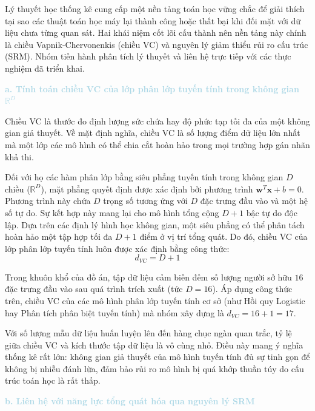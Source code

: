 Lý thuyết học thống kê cung cấp một nền tảng toán học vững chắc để giải thích tại sao các thuật toán học máy lại thành công hoặc thất bại khi đối mặt với dữ liệu chưa từng quan sát. Hai khái niệm cốt lõi cấu thành nên nền tảng này chính là chiều Vapnik-Chervonenkis (chiều VC) và nguyên lý giảm thiểu rủi ro cấu trúc (SRM). Nhóm tiến hành phân tích lý thuyết và liên hệ trực tiếp với các thực nghiệm đã triển khai.

\vspace{0.5em}
\noindent\textcolor{lightblue}{\textbf{a. Tính toán chiều VC của lớp phân lớp tuyến tính trong không gian $\mathbb{R}^D$}}
\vspace{0.5em}

Chiều VC là thước đo định lượng sức chứa hay độ phức tạp tối đa của một không gian giả thuyết. Về mặt định nghĩa, chiều VC là số lượng điểm dữ liệu lớn nhất mà một lớp các mô hình có thể chia cắt hoàn hảo trong mọi trường hợp gán nhãn khả thi.

Đối với họ các hàm phân lớp bằng siêu phẳng tuyến tính trong không gian $D$ chiều ($\mathbb{R}^D$), mặt phẳng quyết định được xác định bởi phương trình $\mathbf{w}^T\mathbf{x} + b = 0$. Phương trình này chứa $D$ trọng số tương ứng với $D$ đặc trưng đầu vào và một hệ số tự do. Sự kết hợp này mang lại cho mô hình tổng cộng $D + 1$ bậc tự do độc lập. Dựa trên các định lý hình học không gian, một siêu phẳng có thể phân tách hoàn hảo một tập hợp tối đa $D + 1$ điểm ở vị trí tổng quát. Do đó, chiều VC của lớp phân lớp tuyến tính luôn được xác định bằng công thức:
\begin{equation}
    d_{VC} = D + 1
\end{equation}

Trong khuôn khổ của đồ án, tập dữ liệu cảm biến đếm số lượng người sở hữu $16$ đặc trưng đầu vào sau quá trình trích xuất (tức $D = 16$). Áp dụng công thức trên, chiều VC của các mô hình phân lớp tuyến tính cơ sở (như Hồi quy Logistic hay Phân tích phân biệt tuyến tính) mà nhóm xây dựng là $d_{VC} = 16 + 1 = 17$. 

Với số lượng mẫu dữ liệu huấn luyện lên đến hàng chục ngàn quan trắc, tỷ lệ giữa chiều VC và kích thước tập dữ liệu là vô cùng nhỏ. Điều này mang ý nghĩa thống kê rất lớn: không gian giả thuyết của mô hình tuyến tính đủ sự tinh gọn để không bị nhiễu đánh lừa, đảm bảo rủi ro mô hình bị quá khớp thuần túy do cấu trúc toán học là rất thấp.

\vspace{0.5em}
\noindent\textcolor{lightblue}{\textbf{b. Liên hệ với năng lực tổng quát hóa qua nguyên lý SRM}}
\vspace{0.5em}


